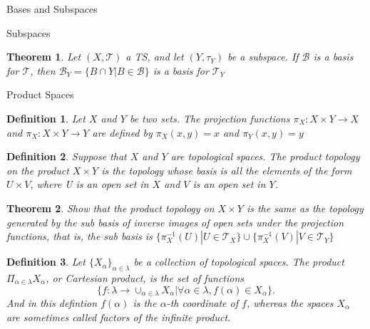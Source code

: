 \documentclass[12pt]{article}
\newtheorem{definition}{Definition}
\newtheorem{theorem}{Theorem}
\begin{document}
\begin{section}{Bases and Subspaces}
\begin{subsection}{Subspaces}
\begin{theorem}
Let $\left(X, \mathcal{T}\right)$ a TS, and let $\left(Y, \tau_{Y} \right)$ be a subspace. If $\mathcal{B}$ is a basis for $\mathcal{T}$, then $\mathcal{B}_{Y} = \{B\cap Y | B \in \mathcal{B} \}$ is a basis for $\mathcal{T}_{Y}$
\end{theorem}
\end{subsection}

\begin{subsection}{Product Spaces}

\begin{definition}
Let $X$ and $Y$ be two sets. The projection functions $\pi_{X}:X\times Y\rightarrow X$ and $\pi_{X}:X\times Y\rightarrow Y$ are defined by $\pi_{X}(x,y) = x$ and $\pi_{Y}(x,y) = y$
\end{definition}

\begin{definition}
Suppose that $X$ and $Y$ are topological spaces. The product topology on the product $X\times Y$ is the topology whose basis is all the elements of the form $U\times V$, where U is an open set in $X$ and $V$ is an open set in $Y$.
\end{definition}

\begin{theorem}
Show that the product topology on $X\times Y$ is the same as the topology generated by the sub basis of inverse images of open sets under the projection functions, that is, the sub basis is $\{ \pi_{X}^{-1}(U) | U\in\mathcal{T}_{X} \}\cup \{ \pi_{X}^{-1}(V) | V\in\mathcal{T}_{Y} \}$
\end{theorem}

\begin{definition}
Let $\{ X_{\alpha}\}_{\alpha\in\lambda}$ be a collection of topological spaces. The product $\Pi_{\alpha\in\lambda}X_{\alpha}$, or Cartesian product, is the set of functions 
$$
\{ f:\lambda\rightarrow\cup_{\alpha\in\lambda}X_{\alpha} | \forall \alpha\in\lambda, f(\alpha)\in X_{\alpha} \}.
$$
And in this defintion $f(\alpha)$ is the $\alpha$-th coordinate of $f$, whereas the spaces $X_{\alpha}$ are sometimes called factors of the infinite product.
\end{definition}

\end{subsection}
\end{section}
\end{document}
